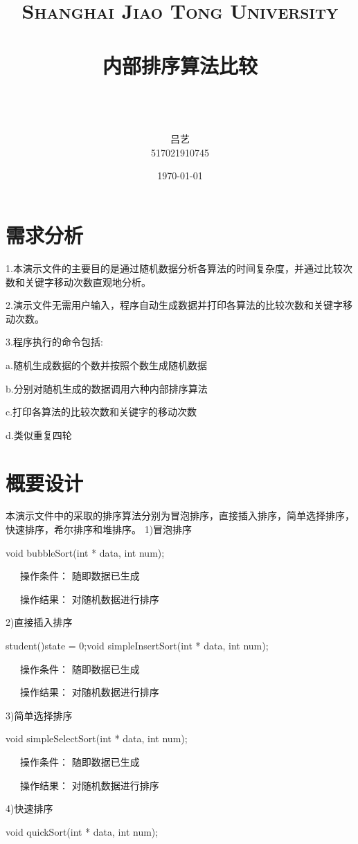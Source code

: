 \documentclass[paper=a4,UTF8,fontsize=11pt]{scrartcl} %
\title{
\normalfont \normalsize
\textsc{Shanghai Jiao Tong University} \\ [25pt] %
\horrule{0.5pt} \\[0.4cm] %
\huge \kaishu 	内部排序算法比较 \\ %
\horrule{2pt} \\[0.5cm] %
}
\author{\\ \kaishu 吕艺\\ \normalsize 517021910745} %
\date{\normalsize\today} %
\numberwithin{equation}{section} %
\numberwithin{figure}{section} %
\numberwithin{table}{section} %
\begin{document}
\maketitle %
\kaishu
\section{需求分析}

1.本演示文件的主要目的是通过随机数据分析各算法的时间复杂度，并通过比较次数和关键字移动次数直观地分析。
\vspace{0.5cm}

2.演示文件无需用户输入，程序自动生成数据并打印各算法的比较次数和关键字移动次数。
\vspace{0.5cm}

3.程序执行的命令包括:

a.随机生成数据的个数并按照个数生成随机数据

b.分别对随机生成的数据调用六种内部排序算法

c.打印各算法的比较次数和关键字的移动次数

d.类似重复四轮

\vspace{0.5cm}

\section{概要设计}
本演示文件中的采取的排序算法分别为冒泡排序，直接插入排序，简单选择排序，快速排序，希尔排序和堆排序。
1)冒泡排序

void bubbleSort(int * data, int num);

\qquad \qquad \quad \ \ \ 操作条件： 随即数据已生成

\qquad \qquad \quad \ \ \ 操作结果： 对随机数据进行排序

2)直接插入排序

student(){state = 0;}void simpleInsertSort(int * data, int num);

\qquad \qquad \quad \ \ \ 操作条件： 随即数据已生成

\qquad \qquad \quad \ \ \ 操作结果： 对随机数据进行排序

3)简单选择排序

void simpleSelectSort(int * data, int num);

\qquad \qquad \quad \ \ \ 操作条件： 随即数据已生成

\qquad \qquad \quad \ \ \ 操作结果： 对随机数据进行排序

4)快速排序

void quickSort(int * data, int num);
\end{document}
